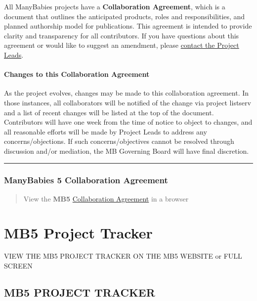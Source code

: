 \documentclass[
  letterpaper,
  DIV=11,
  numbers=noendperiod,
  oneside]{scrreprt}
\begin{document}
All ManyBabies projects have a \textbf{Collaboration Agreement}, which
is a document that outlines the anticipated products, roles and
responsibilities, and planned authorship model for publications. This
agreement is intended to provide clarity and transparency for all
contributors. If you have questions about this agreement or would like
to suggest an amendment, please \href{mailto:mb5@manybabies.org}{contact
the Project Leads}.

\subsubsection{Changes to this Collaboration
Agreement}\label{changes-to-this-collaboration-agreement}

As the project evolves, changes may be made to this collaboration
agreement. In those instances, all collaborators will be notified of the
change via project listserv and a list of recent changes will be listed
at the top of the document. Contributors will have one week from the
time of notice to object to changes, and all reasonable efforts will be
made by Project Leads to address any concerns/objections. If such
concerns/objectives cannot be resolved through discussion and/or
mediation, the MB Governing Board will have final discretion.

\begin{center}\rule{0.5\linewidth}{0.5pt}\end{center}

\subsection{ManyBabies 5 Collaboration
Agreement}\label{collaboration-agreement}

\begin{quote}
View the \textbf{MB5}
\href{https://docs.google.com/document/d/1vbTDmH6euda5pJN4uyds3zsnQ1DXrW9wpHogwC-5TSk/edit?usp=sharing}{Collaboration
Agreement} in a browser
\end{quote}

\chapter{MB5 Project Tracker}\label{sec-tracker}

VIEW THE MB5 PROJECT TRACKER ON THE MB5 WEBSITE or FULL SCREEN

\section*{MB5 PROJECT TRACKER}\label{mb5-project-tracker}
\end{document}
